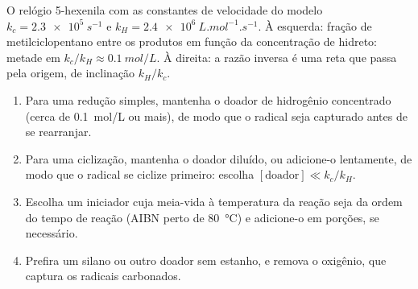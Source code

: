 \begin{omfigure}

{\small O relógio 5-hexenila com as constantes de velocidade do modelo $k_c = \qty{2.3e5}{s^{-1}}$ e
$k_H = \qty{2.4e6}{L.mol^{-1}.s^{-1}}$. À esquerda: fração de metilciclopentano entre os produtos em função da
concentração de hidreto: metade em $k_c/k_H \approx \qty{0.1}{mol/L}$. À direita: a razão inversa é uma reta
que passa pela origem, de inclinação $k_H/k_c$.}
\end{omfigure}

\begin{method}\label{met:b3:radicals-carbenes:radical-chain}
\begin{enumerate}
  \item Para uma redução simples, mantenha o doador de hidrogênio concentrado (cerca de
        \qty{0.1}{mol/L} ou mais), de modo que o radical seja capturado antes de se rearranjar.
  \item Para uma ciclização, mantenha o doador diluído, ou adicione-o lentamente, de modo que o
        radical se ciclize primeiro: escolha $[\text{doador}] \ll k_c/k_H$.
  \item Escolha um iniciador cuja meia-vida à temperatura da reação seja da
        ordem do tempo de reação (AIBN perto de \qty{80}{\celsius}) e adicione-o em porções, se
        necessário.
  \item Prefira um silano ou outro doador sem estanho, e remova o oxigênio, que captura
        os radicais carbonados.
\end{enumerate}
\end{method}

